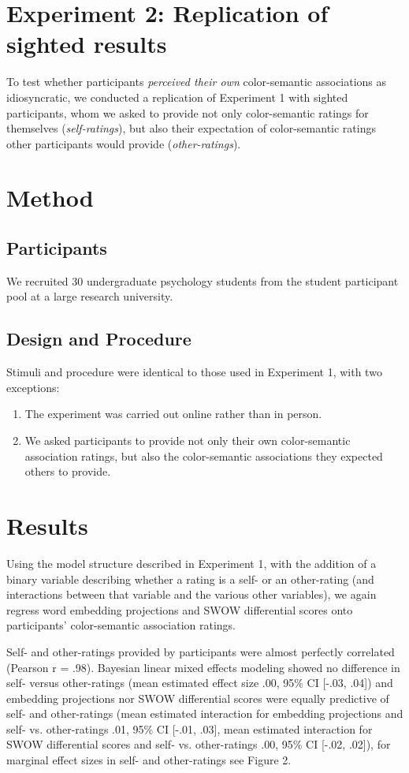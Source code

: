 \documentclass[10pt,letterpaper]{article}
\begin{document}
\section{Experiment 2: Replication of sighted results}
To test whether participants \emph{perceived their own} color-semantic associations as idiosyncratic, we conducted a replication of Experiment 1 with sighted participants, whom we asked to provide not only color-semantic ratings for themselves (\emph{self-ratings}), but also their expectation of color-semantic ratings other participants would provide (\emph{other-ratings}).
\section{Method}
\subsection{Participants}
We recruited 30 undergraduate psychology students from the student participant pool at a large research university.
\subsection{Design and Procedure}
Stimuli and procedure were identical to those used in Experiment 1, with two exceptions:
\begin{enumerate}
\item The experiment was carried out online rather than in person.
\item We asked participants to provide not only their own color-semantic association ratings, but also the color-semantic associations they expected others to provide.
\end{enumerate}

\section{Results}
Using the model structure described in Experiment 1, with the addition of a binary variable describing whether a rating is a self- or an other-rating (and interactions between that variable and the various other variables), we again regress word embedding projections and SWOW differential scores onto participants' color-semantic association ratings.

Self- and other-ratings provided by participants were almost perfectly correlated (Pearson r = .98). Bayesian linear mixed effects modeling showed no difference in self- versus other-ratings (mean estimated effect size .00, 95\% CI [-.03, .04]) and embedding projections nor SWOW differential scores were equally predictive of self- and other-ratings (mean estimated interaction for embedding projections and self- vs. other-ratings .01, 95\% CI [-.01, .03], mean estimated interaction for SWOW differential scores and self- vs. other-ratings .00, 95\% CI [-.02, .02]), for marginal effect sizes in self- and other-ratings see Figure 2.
\end{document}
